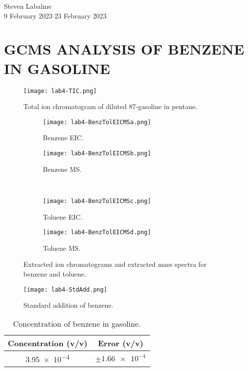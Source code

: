\documentclass[../labs.tex]{subfiles}
\begin{document}
\noindent Steven Labalme\\
9 February 2023\hfill
23 February 2023

\section{GCMS ANALYSIS OF BENZENE IN GASOLINE}
\begin{figure}[H]
    \centering
    \texttt{[image: lab4-TIC.png]}
    \caption{Total ion chromatogram of diluted 87-gasoline in pentane.}
    \label{fig:TIC}
\end{figure}

\begin{figure}[H]
    \centering
    \begin{subfigure}[b]{0.49\linewidth}
        \centering
        \texttt{[image: lab4-BenzTolEICMSa.png]}
        \caption{Benzene EIC.}
        \label{fig:BenzTolEICMSa}
    \end{subfigure}
    \begin{subfigure}[b]{0.49\linewidth}
        \centering
        \texttt{[image: lab4-BenzTolEICMSb.png]}
        \caption{Benzene MS.}
        \label{fig:BenzTolEICMSb}
    \end{subfigure}\\[1em]
    \begin{subfigure}[b]{0.49\linewidth}
        \centering
        \texttt{[image: lab4-BenzTolEICMSc.png]}
        \caption{Toluene EIC.}
        \label{fig:BenzTolEICMSc}
    \end{subfigure}
    \begin{subfigure}[b]{0.49\linewidth}
        \centering
        \texttt{[image: lab4-BenzTolEICMSd.png]}
        \caption{Toluene MS.}
        \label{fig:BenzTolEICMSd}
    \end{subfigure}
    \caption{Extracted ion chromatograms and extracted mass spectra for benzene and toluene.}
    \label{fig:BenzTolEICMS}
\end{figure}

\begin{figure}[H]
    \centering
    \texttt{[image: lab4-StdAdd.png]}
    \caption{Standard addition of benzene.}
    \label{fig:StdAdd}
\end{figure}

\begin{table}[H]
    \centering
    \small
    \renewcommand{\arraystretch}{1.2}
    \begin{tabular}{|c|c|}
        \hline
        \textbf{Concentration (v/v)} & \textbf{Error (v/v)}\\
        \hline
        \num{3.95e-4} & $\pm\num{1.66e-4}$\\
        \hline
    \end{tabular}
    \caption{Concentration of benzene in gasoline.}
    \label{tab:benzeneConcError}
\end{table}
\end{document}
